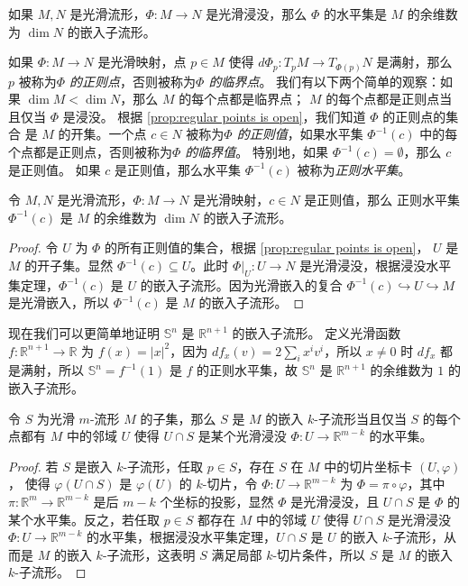 \documentclass[fontset=none]{Notes}
\newcommand{\abs}[1]{\left|#1\right|}
\begin{document}
\begin{corollary}[浸没水平集定理]
  如果 $M,N$ 是光滑流形，$\varPhi:M\to N$ 是光滑浸没，那么 $\varPhi$
  的水平集是 $M$ 的余维数为 $\dim N$ 的嵌入子流形。
\end{corollary}

如果 $\varPhi:M\to N$ 是光滑映射，点 $p\in M$ 使得 $d\varPhi_p:T_pM\to T_{\varPhi(p)}N$
是满射，那么 $p$ 被称为\emph{$\varPhi$ 的正则点}，否则被称为\emph{$\varPhi$ 的临界点}。
我们有以下两个简单的观察：如果 $\dim M<\dim N$，那么 $M$ 的每个点都是临界点；
$M$ 的每个点都是正则点当且仅当 $\varPhi$ 是浸没。
根据 \autoref{prop:regular points is open}，我们知道 $\varPhi$ 的正则点的集合
是 $M$ 的开集。一个点 $c\in N$ 被称为\emph{$\varPhi$ 的正则值}，如果水平集
$\varPhi^{-1}(c)$ 中的每个点都是正则点，否则被称为\emph{$\varPhi$ 的临界值}。
特别地，如果 $\varPhi^{-1}(c)=\emptyset$，那么 $c$ 是正则值。
如果 $c$ 是正则值，那么水平集 $\varPhi^{-1}(c)$ 被称为\emph{正则水平集}。

\begin{corollary}[正则水平集定理]
  令 $M,N$ 是光滑流形，$\varPhi:M\to N$ 是光滑映射，$c\in N$ 是正则值，那么
  正则水平集 $\varPhi^{-1}(c)$ 是 $M$ 的余维数为 $\dim N$ 的嵌入子流形。
\end{corollary}
\begin{proof}
  令 $U$ 为 $\varPhi$ 的所有正则值的集合，根据 \autoref{prop:regular points is open}，
  $U$ 是 $M$ 的开子集。显然 $\varPhi^{-1}(c)\subseteq U$。此时
  $\varPhi|_U:U\to N$ 是光滑浸没，根据浸没水平集定理，$\varPhi^{-1}(c)$
  是 $U$ 的嵌入子流形。因为光滑嵌入的复合 $\varPhi^{-1}(c)\hookrightarrow U\hookrightarrow M$
  是光滑嵌入，所以 $\varPhi^{-1}(c)$ 是 $M$ 的嵌入子流形。
\end{proof}

\begin{example}[球面]
  现在我们可以更简单地证明 $\mathbb{S}^n$ 是 $\mathbb{R}^{n+1}$ 的嵌入子流形。
  定义光滑函数 $f:\mathbb{R}^{n+1}\to\mathbb{R}$ 为 $f(x)=\abs{x}^2$，因为
  $df_x(v)=2\sum_i x^iv^i$，所以 $x\neq 0$ 时 $df_x$ 都是满射，所以
  $\mathbb{S}^n=f^{-1}(1)$ 是 $f$ 的正则水平集，故 $\mathbb{S}^n$
  是 $\mathbb{R}^{n+1}$ 的余维数为 $1$ 的嵌入子流形。
\end{example}

\begin{proposition}
  令 $S$ 为光滑 $m$-流形 $M$ 的子集，那么 $S$ 是 $M$ 的嵌入 $k$-子流形当且仅当
  $S$ 的每个点都有 $M$ 中的邻域 $U$ 使得 $U\cap S$ 是某个光滑浸没 $\varPhi:U\to \mathbb{R}^{m-k}$
  的水平集。
\end{proposition}
\begin{proof}
  若 $S$ 是嵌入 $k$-子流形，任取 $p\in S$，存在 $S$ 在 $M$ 中的切片坐标卡 $(U,\varphi)$，
  使得 $\varphi(U\cap S)$ 是 $\varphi(U)$ 的 $k$-切片，令 $\varPhi:U\to \mathbb{R}^{m-k}$
  为 $\varPhi=\pi\circ\varphi$，其中 $\pi:\mathbb{R}^m\to \mathbb{R}^{m-k}$
  是后 $m-k$ 个坐标的投影，显然 $\varPhi$ 是光滑浸没，且 
  $U\cap S$ 是 $\varPhi$ 的某个水平集。反之，若任取 $p\in S$
  都存在 $M$ 中的邻域 $U$ 使得 $U\cap S$ 是光滑浸没 $\varPhi:U\to \mathbb{R}^{m-k}$
  的水平集，根据浸没水平集定理，$U\cap S$ 是 $U$ 的嵌入 $k$-子流形，从而是
  $M$ 的嵌入 $k$-子流形，这表明 $S$ 满足局部 $k$-切片条件，所以
  $S$ 是 $M$ 的嵌入 $k$-子流形。
\end{proof}
\end{document}
